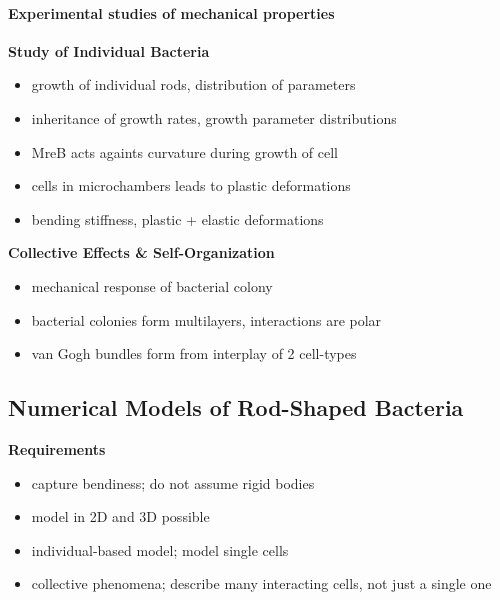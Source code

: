 \documentclass{article}
\begin{document}
\paragraph{Experimental studies of mechanical properties}
\textbf{Study of Individual Bacteria}
\begin{itemize}
    \item \cite{Robert2014} growth of individual rods, distribution of parameters
    \item \cite{Koutsoumanis2013} inheritance of growth rates, growth parameter distributions
    \item \cite{Ursell2014} MreB acts againts curvature during growth of cell
    \item \cite{Takeuchi2005} cells in microchambers leads to plastic deformations
    \item \cite{Amir2014} bending stiffness, plastic + elastic deformations
\end{itemize}
\textbf{Collective Effects \& Self-Organization}
\begin{itemize}
    \item \cite{Trejo2013} mechanical response of bacterial colony
    \item \cite{Duvernoy2018} bacterial colonies form multilayers, interactions are polar
    \item \cite{vanGestel2015} van Gogh bundles form from interplay of 2 cell-types
\end{itemize}

\subsection{Numerical Models of Rod-Shaped Bacteria}
\textbf{Requirements}
\begin{itemize}
    \item capture bendiness; do not assume rigid bodies
    \item model in 2D and 3D possible
    \item individual-based model; model single cells
    \item collective phenomena; describe many interacting cells, not just a single one
\end{itemize}
\end{document}
